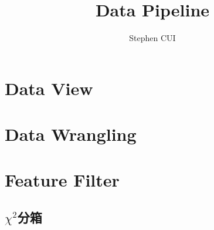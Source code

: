 \documentclass{article}
\title{Data Pipeline}
\author{Stephen CUI}
\begin{document}
\maketitle
\section{Data View}
\section{Data Wrangling}
\section{Feature Filter}
\subsection{$\chi^2$分箱}
\end{document}

